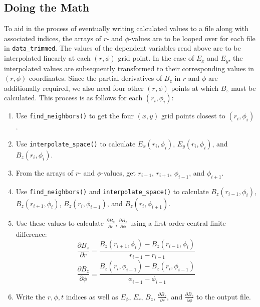 \documentclass[hidelinks,12pt]{article}
\newcommand{\Partl}[2]{\frac{\partial{#1}}{\partial{#2}}} %
\begin{document}
\subsection{Doing the Math}
To aid in the process of eventually writing calculated values to a file along with associated indices, the arrays of $r$- and $\phi$-values are to be looped over for each file in \texttt{data\_trimmed}. The values of the dependent variables read above are to be interpolated linearly at each $(r,\phi)$ grid point. In the case of $E_{x}$ and $E_{y}$, the interpolated values are subsequently transformed to their corresponding values in $(r,\phi)$ coordinates. Since the partial derivatives of $B_{z}$ in $r$ and $\phi$ are additionally required, we also need four other $(r,\phi)$ points at which $B_{z}$ must be calculated. This process is as follows for each $(r_{i},\phi_{i})$:
\begin{enumerate}[label={\arabic{enumi}.},leftmargin={1cm},rightmargin={1cm}]
    \item Use \texttt{find\_neighbors()} to get the four $(x,y)$ grid points closest to $(r_{i},\phi_{i})$.
    \item Use \texttt{interpolate\_space()} to calculate $E_{x}(r_{i},\phi_{i})$, $E_{y}(r_{i},\phi_{i})$, and $B_{z}(r_{i},\phi_{i})$.
    \item From the arrays of $r$- and $\phi$-values, get $r_{i-1}$, $r_{i+1}$, $\phi_{i-1}$, and $\phi_{i+1}$.
    \item Use \texttt{find\_neighbors()} and \texttt{interpolate\_space()} to calculate $B_{z}(r_{i-1},\phi_{i})$, $B_{z}(r_{i+1},\phi_{i})$, $B_{z}(r_{i},\phi_{i-1})$, and $B_{z}(r_{i},\phi_{i+1})$.
    \item Use these values to calculate $\Partl{B_{z}}{r},\Partl{B_{z}}{\phi}$ using a first-order central finite difference:
        \begin{equation}
            \Partl{B_{z}}{r} = \frac{B_{z}(r_{i+1},\phi_{i}) - B_{z}(r_{i-1},\phi_{i})}{r_{i+1} - r_{i-1}}
        \end{equation}
        \begin{equation}
            \Partl{B_{z}}{\phi} = \frac{B_{z}(r_{i},\phi_{i+1}) - B_{z}(r_{i},\phi_{i-1})}{\phi_{i+1} - \phi_{i-1}}
        \end{equation}
    \item Write the $r,\phi,t$ indices as well as $E_{\phi}$, $E_{r}$, $B_{z}$, $\Partl{B_{z}}{r}$, and $\Partl{B_{z}}{\phi}$ to the output file.
\end{enumerate}
\end{document}

